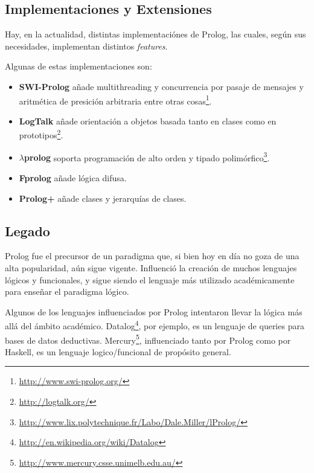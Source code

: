 \documentclass[12pt,titlepage]{article}
\begin{document}


\subsection{Implementaciones y Extensiones}

Hay, en la actualidad, distintas implementaciónes de Prolog, las cuales, según sus necesidades, implementan distintos \textit{features}.

Algunas de estas implementaciones son:
\begin{itemize}
    \item \textbf{SWI-Prolog} añade multithreading y concurrencia por pasaje de mensajes y aritmética de presición arbitraria entre otras cosas\footnote{\url{http://www.swi-prolog.org/}}.
    \item \textbf{LogTalk} añade orientación a objetos basada tanto en clases como en prototipos\footnote{\url{http://logtalk.org/}}.
    \item \textbf{$\lambda$prolog} soporta programación de alto orden y tipado polimórfico\footnote{\url{http://www.lix.polytechnique.fr/Labo/Dale.Miller/lProlog/}}.
    \item \textbf{Fprolog} añade lógica difusa.
    \item \textbf{Prolog+} añade clases y jerarquías de clases.
\end{itemize}

\subsection{Legado}

Prolog fue el precursor de un paradigma que, si bien hoy en día no goza de una alta popularidad, aún sigue vigente. Influenció la creación de muchos lenguajes lógicos y funcionales, y sigue siendo el lenguaje más utilizado académicamente para enseñar el paradigma lógico.

Algunos de los lenguajes influenciados por Prolog intentaron llevar la lógica más allá del ámbito académico. Datalog\footnote{\url{http://en.wikipedia.org/wiki/Datalog}}, por ejemplo, es un lenguaje de queries para bases de datos deductivas. Mercury\footnote{\url{http://www.mercury.csse.unimelb.edu.au/}}, influenciado tanto por Prolog como por Haskell, es un lenguaje logico/funcional de propósito general.
\end{document}
